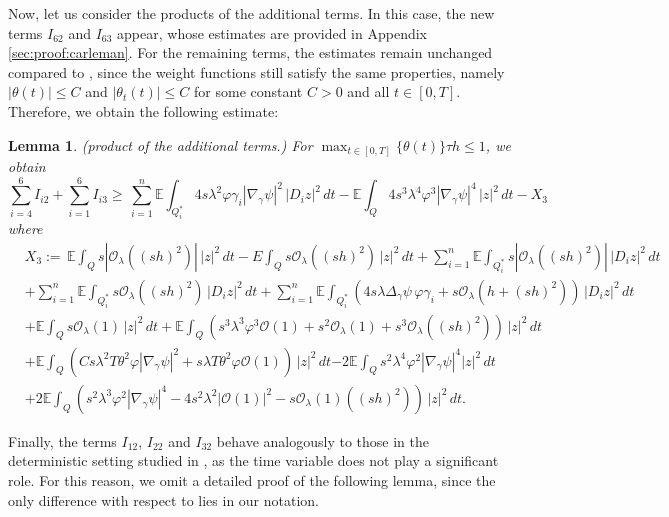 \documentclass[11pt,oneside,leqno]{amsart}
\numberwithin{equation}{section}
\numberwithin{equation}{section}
\newcommand{\E}{\mathbb{E}}
\newtheorem{lemma}[theorem]{Lemma}
\begin{document}
Now, let us consider the products of the additional terms. In this case, the new terms $I_{62}$ and $I_{63}$ appear, whose estimates are provided in Appendix \ref{sec:proof:carleman}. For the remaining terms, the estimates remain unchanged compared to \cite{LPP:2025}, since the weight functions still satisfy the same properties, namely $|\theta(t)| \leq C$ and $|\theta_t(t)| \leq C$ for some constant $C>0$ and all $t \in [0,T]$. Therefore, we obtain the following estimate:
\begin{lemma}\label{lem:AdditionalsTerms}
    (\textit{product of the additional terms.}) For $\displaystyle \max_{t\in[0,T]}\{\theta(t)\}\tau h\leq 1$, we obtain
    \begin{equation*}
        \sum_{i=4}^{6}I_{i2}+\sum_{i=1}^{6}I_{i3}\geq\, \sum_{i=1}^{n}\E\int_{Q_{i}^{\ast}}4s\lambda^2\varphi\gamma_i|\nabla_{\gamma}\psi|^2\,|D_iz|^2\,dt-\E\int_{Q}4s^3\lambda^4\varphi^3|\nabla_{\gamma}\psi|^4\,|z|^2\,dt-X_3
    \end{equation*}
where
\begin{align*}
        &X_3:=\, \E\int_{Q} s|\mathcal{O}_{\lambda}((sh)^2)|\,|z|^2\,dt-E\int_{Q}s\mathcal{O}_{\lambda}((sh)^2)\,|z|^2\,dt+\sum_{i=1}^{n} \E\int_{Q_i^{\ast}}s|\mathcal{O}_{\lambda}((sh)^2)|\,|D_iz|^2\,dt\\
        &+\sum_{i=1}^{n} \E\int_{Q_i^{\ast}}s\mathcal{O}_{\lambda}((sh)^2)\,|D_iz|^2\,dt +\sum_{i=1}^{n}\E\int_{Q_i^{\ast}}(4s\lambda\Delta_{\gamma}\psi\, \varphi \gamma_i+s\mathcal{O}_{\lambda}(h+(sh)^2))\,|D_iz|^2\,dt\\
        &+\E\int_{Q}s\mathcal{O}_{\lambda}(1)\,|z|^2\,dt+\E\int_{Q}(s^3\lambda^3\varphi^3\mathcal{O}(1)+s^2\mathcal{O}_{\lambda}(1)+s^3\mathcal{O}_{\lambda}((sh)^2))\,|z|^2\,dt\\
        &+\E\int_{Q} (Cs\lambda^2T\theta^2\varphi|\nabla_{\gamma}\psi|^2+s\lambda T\theta^2\varphi\mathcal{O}(1))\,|z|^2\,dt {-2\E\int_{Q}s^2\lambda^4\varphi^2|\nabla_{\gamma}\psi|^4|z|^2\,dt}\\
        &{+2\E\int_{Q}(s^2\lambda^3\varphi^2|\nabla_{\gamma}\psi|^4-4s^2\lambda^2|\mathcal{O}(1)|^2-s\mathcal{O}_{\lambda}(1)((sh)^2))\,|z|^2\,dt}.
\end{align*}
\end{lemma}
Finally, the terms $I_{12}$, $I_{22}$ and $I_{32}$ behave analogously to those in the deterministic setting studied in \cite{boyer-2014}, as the time variable does not play a significant role. For this reason, we omit a detailed proof of the following lemma, since the only difference with respect to \cite{boyer-2014} lies in our notation.
\end{document}
